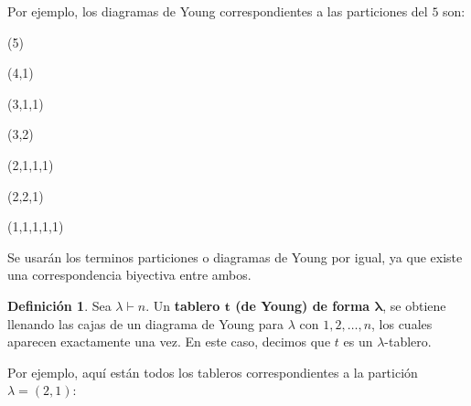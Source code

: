 \documentclass[12pt]{book}
\theoremstyle{definition}
\newtheorem{definition}[theorem]{Definición}
\newcounter{in}
\newcounter{ini}
\begin{document}
Por ejemplo, los diagramas de Young correspondientes a las particiones
del $5$ son: 

\begin{center}
  \begin{minipage}[h]{0.16\linewidth}
    \centering {}\bigskip

    (5)
  \end{minipage}
  \begin{minipage}[h]{0.13\linewidth}
    \centering {}\medskip

    (4,1)
  \end{minipage}
  \begin{minipage}[h]{0.15\linewidth}
    \centering {}\medskip

    (3,1,1)
  \end{minipage}
  \begin{minipage}[h]{0.10\linewidth}
    \centering {}\smallskip

    (3,2)
  \end{minipage}
  \begin{minipage}[h]{0.10\linewidth}
    \centering {}\smallskip

    (2,1,1,1)
  \end{minipage}
  \begin{minipage}[h]{0.10\linewidth}
    \centering {}\smallskip

    (2,2,1)
  \end{minipage}
  \begin{minipage}[h]{0.10\linewidth}
    \centering {}\smallskip

    (1,1,1,1,1)
  \end{minipage}
\end{center}

Se usarán los terminos particiones o diagramas de Young por igual, ya que existe una correspondencia biyectiva entre ambos.
\begin{definition}
  Sea $\lambda\vdash n$. Un \textbf{tablero $\boldsymbol{t}$ (de Young) de forma
    $\boldsymbol{\lambda}$}, se obtiene llenando las cajas de un
  diagrama de Young para $\lambda$ con $1,2,\ldots,n$, los cuales
  aparecen exactamente una vez. En este caso, decimos que $t$ es un
  $\lambda$-tablero.
\end{definition}

Por ejemplo, aquí están todos los tableros correspondientes a la
partición~$\lambda = (2,1)$:
\end{document}

